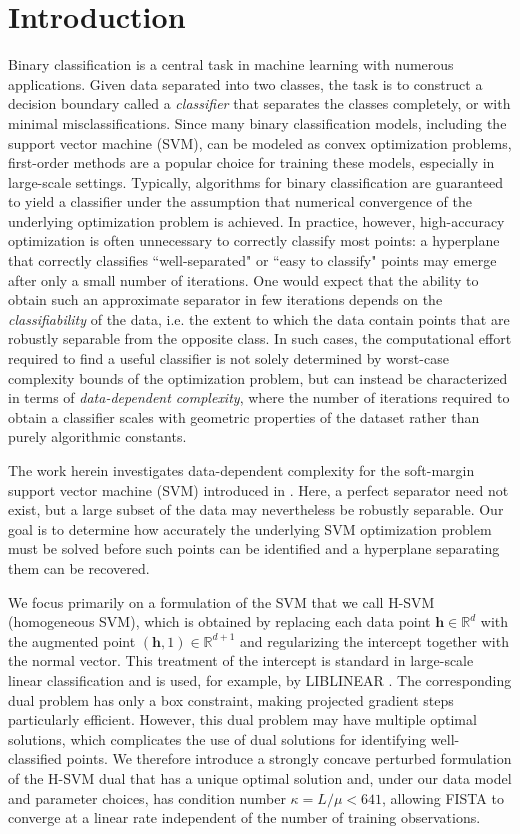 \documentclass[twoside,11pt]{article}
\newcommand{\R}{{\mathbb{R}}} %
\newcommand\h{\bm{h}}
\begin{document}
\section{Introduction}
Binary classification is a central task in machine learning with numerous applications. Given data separated into two classes, the task
is to construct a decision boundary called a \textit{classifier} that separates the classes completely, or with minimal
misclassifications. Since many binary classification models, including the support vector machine (SVM), can be modeled as convex optimization problems,
first-order methods are a popular choice for training these models, especially in large-scale settings.
Typically, algorithms for binary classification are guaranteed to yield a classifier under the assumption that numerical convergence
of the underlying optimization problem is achieved. In practice, however, high-accuracy optimization is often unnecessary to correctly classify most points:
a hyperplane that correctly classifies ``well-separated" or ``easy to classify" points may emerge after only a small number of iterations.
One would expect that the ability to obtain such an approximate separator in few iterations depends on the
\textit{classifiability} of the data, i.e. the extent to which the data contain points that are robustly separable from the opposite class.
In such cases, the computational effort required to find a useful classifier is not solely determined by worst-case complexity
bounds of the optimization problem, but can instead be characterized in terms of \textit{data-dependent complexity}, where
the number of iterations required to obtain a classifier scales with geometric properties of the dataset rather than purely algorithmic constants.

The work herein investigates data-dependent complexity for the soft-margin support vector machine (SVM) introduced in \cite{Cortes1995}. Here, a perfect separator need not exist, but a large subset of the data may nevertheless be robustly separable. Our goal is to determine how accurately the underlying SVM optimization problem must be solved before such points can be identified and a hyperplane separating them can be recovered.

We focus primarily on a formulation of the SVM that we call H-SVM (homogeneous SVM), which is obtained by replacing each data point $\h \in \R^d$ with the augmented point $(\h,1) \in \R^{d+1}$ and regularizing the intercept together with the normal vector. This treatment of the intercept is standard in large-scale linear classification and is used, for example, by LIBLINEAR \citep{LIBLINEAR}. The corresponding dual problem has only a box constraint, making projected gradient steps particularly efficient. However, this dual problem may have multiple optimal solutions, which complicates the use of dual solutions for identifying well-classified points. We therefore introduce a strongly concave perturbed formulation of the H-SVM dual that has a unique optimal solution and, under our data model and parameter choices, has condition number $\kappa = L/\mu < 641$, allowing FISTA to converge at a linear rate independent of the number of training observations.
\end{document}
